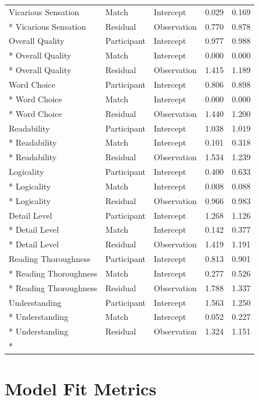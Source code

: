 \begin{longtable}{l l l r r}
  Vicarious Sensation & Match & Intercept & 0.029 & 0.169\\*
  Vicarious Sensation & Residual & Observation & 0.770 & 0.878\\
  \addlinespace
  Overall Quality & Participant & Intercept & 0.977 & 0.988\\*
  Overall Quality & Match & Intercept & 0.000 & 0.000\\*
  Overall Quality & Residual & Observation & 1.415 & 1.189\\
  \addlinespace
  Word Choice & Participant & Intercept & 0.806 & 0.898\\*
  Word Choice & Match & Intercept & 0.000 & 0.000\\*
  Word Choice & Residual & Observation & 1.440 & 1.200\\
  \addlinespace
  Readability & Participant & Intercept & 1.038 & 1.019\\*
  Readability & Match & Intercept & 0.101 & 0.318\\*
  Readability & Residual & Observation & 1.534 & 1.239\\
  \addlinespace
  Logicality & Participant & Intercept & 0.400 & 0.633\\*
  Logicality & Match & Intercept & 0.008 & 0.088\\*
  Logicality & Residual & Observation & 0.966 & 0.983\\
  \addlinespace
  Detail Level & Participant & Intercept & 1.268 & 1.126\\*
  Detail Level & Match & Intercept & 0.142 & 0.377\\*
  Detail Level & Residual & Observation & 1.419 & 1.191\\
  \addlinespace
  Reading Thoroughness & Participant & Intercept & 0.813 & 0.901\\*
  Reading Thoroughness & Match & Intercept & 0.277 & 0.526\\*
  Reading Thoroughness & Residual & Observation & 1.788 & 1.337\\
  \addlinespace
  Understanding & Participant & Intercept & 1.563 & 1.250\\*
  Understanding & Match & Intercept & 0.052 & 0.227\\*
  Understanding & Residual & Observation & 1.324 & 1.151\\*
\end{longtable}

\section{Model Fit Metrics}

